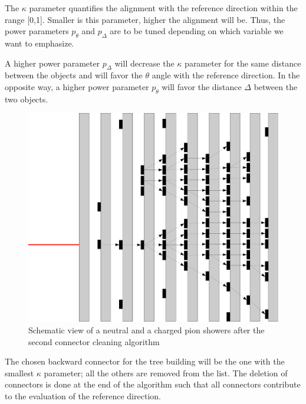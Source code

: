 \documentclass[cits]{JINST}
\begin{document}
The $\kappa$ parameter quantifies the alignment with the reference direction within the range [0,1]. Smaller is this parameter, higher the alignment will be. Thus, the power parameters $p_{\theta}$ and $p_{\Delta}$ are to be tuned depending on which variable we want to emphasize. 

A higher power parameter $p_{\Delta}$ will decrease the $\kappa$ parameter for the same distance between the objects and will favor the $\theta$ angle with the reference direction. In the opposite way, a higher power parameter $p_{\theta}$ will favor the distance $\Delta$ between the two objects. 

\begin{figure}
  \vspace{-10pt}
  \begin{center}
    \includegraphics[width=\linewidth]{ConnectorCleaning2.pdf}
  \end{center}
  \vspace{-10pt}
  \caption{\label{ARBOR_CONNECTOR_CLEANING_2} Schematic view of a neutral and a charged pion showers after the second connector cleaning algorithm}
  \vspace{-30pt}
\end{figure}

The chosen backward connector for the tree building will be the one with the smallest $\kappa$ parameter; all the others are removed from the list. The deletion of connectors is done at the end of the algorithm such that all connectors contribute to the evaluation of the reference direction.
\end{document}
